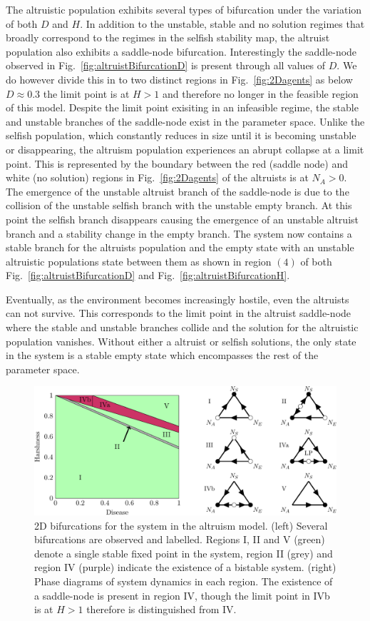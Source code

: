 \documentclass[11pt]{article}
\begin{document}
The altruistic population exhibits several types of bifurcation under the variation of both $D$ and $H$. In addition to the unstable, stable and no solution regimes that broadly correspond to the regimes in the selfish stability map, the altruist population also exhibits a saddle-node bifurcation. Interestingly the saddle-node observed in Fig.~\ref{fig:altruistBifurcationD} is present through all values of $D$. We do however divide this in to two distinct regions in Fig.~\ref{fig:2Dagents} as below $D\approx0.3$ the limit point is at $H>1$ and therefore no longer in the feasible region of this model. Despite the limit point exisiting in an infeasible regime, the stable and unstable branches of the saddle-node exist in the parameter space. Unlike the selfish population, which constantly reduces in size until it is becoming unstable or disappearing, the altruism population experiences an abrupt collapse at a limit point. This is represented by the boundary between the red (saddle node) and white (no solution) regions in Fig.~\ref{fig:2Dagents} of the altruists is at $N_A>0$. The emergence of the unstable altruist branch of the saddle-node is due to the collision of the unstable selfish branch with the unstable empty branch. At this point the selfish branch disappears causing the emergence of an unstable altruist branch and a stability change in the empty branch. The system now contains a stable branch for the altruists population and the empty state with an unstable altruistic populations state between them as shown in region $(4)$ of both Fig.~\ref{fig:altruistBifurcationD} and Fig.~\ref{fig:altruistBifurcationH}. 

Eventually, as the environment becomes increasingly hostile, even the altruists can not survive. This corresponds to the limit point in the altruist saddle-node where the stable and unstable branches collide and the solution for the altruistic population vanishes. Without either a altruist or selfish solutions, the only state in the system is a stable empty state which encompasses the rest of the parameter space. 



 \begin{figure}[ht]
	\centering
	\includegraphics[width=0.8\linewidth]{2DBifurcationsSystem}	
	\caption{2D bifurcations for the system in the altruism model. (left) Several bifurcations are observed and labelled. Regions I, II and V (green) denote a single stable fixed point in the system, region II (grey) and region IV (purple) indicate the existence of a bistable system. (right) Phase diagrams of system dynamics in each region. The existence of a saddle-node is present in region IV, though the limit point in IVb is at $H>1$ therefore is distinguished from IV.
	\label{fig:2Dsystem}}
\end{figure}	
\end{document}
